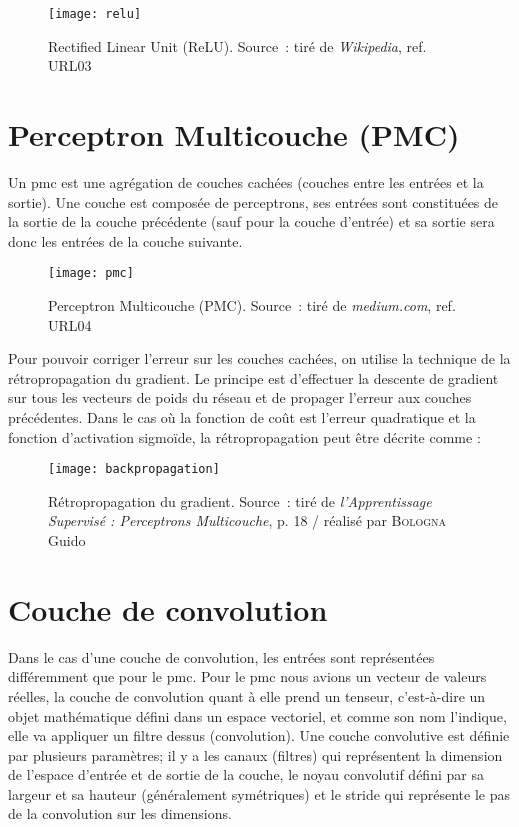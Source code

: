 \begin{figure}[H]
	\centering
	\texttt{[image: relu]}
	\caption[Rectified Linear Unit (ReLU)]{Rectified Linear Unit (ReLU). Source : tiré de \textit{Wikipedia}, ref. URL03}
	\label{fig:relu}
\end{figure}

\section{Perceptron Multicouche (PMC)}
\label{sec:3.3}

Un \gls{pmc} est une agrégation de couches cachées (couches entre les entrées et la sortie). Une couche est composée de perceptrons, ses entrées sont constituées de la sortie de la couche précédente (sauf pour la couche d'entrée) et sa sortie sera donc les entrées de la couche suivante.

\begin{figure}[H]
	\centering
	\texttt{[image: pmc]}
	\caption[Perceptron Multicouche (PMC)]{Perceptron Multicouche (PMC). Source : tiré de \textit{medium.com}, ref. URL04}
	\label{fig:pmc}
\end{figure}

Pour pouvoir corriger l’erreur sur les couches cachées, on utilise la technique de la rétropropagation du gradient. Le principe est d’effectuer la descente de gradient sur tous les vecteurs de poids du réseau et de propager l’erreur aux couches précédentes. Dans le cas où la fonction de coût est l’erreur quadratique et la fonction d’activation sigmoïde, la rétropropagation peut être décrite comme :

\begin{figure}[H]
	\centering
	\texttt{[image: backpropagation]}
	\caption[Rétropropagation du gradient]{Rétropropagation du gradient. Source : tiré de \textit{l'Apprentissage Supervisé : Perceptrons Multicouche}, p. 18 / réalisé par \textsc{Bologna} Guido}
	\label{fig:retropropagation}
\end{figure}

\section{Couche de convolution}
\label{sec:3.4}

Dans le cas d'une couche de convolution, les entrées sont représentées différemment que pour le \gls{pmc}. Pour le \gls{pmc} nous avions un vecteur de valeurs réelles, la couche de convolution quant à elle prend un tenseur, c’est-à-dire un objet mathématique défini dans un espace vectoriel, et comme son nom l'indique, elle va appliquer un filtre dessus (convolution). Une couche convolutive est définie par plusieurs paramètres; il y a les canaux (filtres) qui représentent la dimension de l’espace d'entrée et de sortie de la couche, le noyau convolutif défini par sa largeur et sa hauteur (généralement symétriques) et le stride qui représente le pas de la convolution sur les dimensions.

